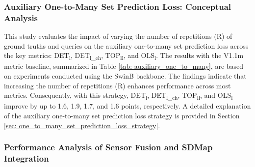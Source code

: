 \subsubsection{Auxiliary One-to-Many Set Prediction Loss: Conceptual Analysis}
\label{sec: exp_one_to_many}

This study evaluates the impact of varying the number of repetitions (R) of ground truths and queries on the auxiliary one-to-many set prediction loss across the key metrics: DET\textsubscript{l}, DET\textsubscript{l\_ch}, TOP\textsubscript{ll}, and OLS\textsubscript{l}. The results with the V1.1m metric baseline, summarized in Table \ref{tab: auxiliary_one_to_many}, are based on experiments conducted using the SwinB backbone. The findings indicate that increasing the number of repetitions (R) enhances performance across most metrics. Consequently, with this strategy, DET\textsubscript{l}, DET\textsubscript{l\_ch}, TOP\textsubscript{ll}, and OLS\textsubscript{l} improve by up to 1.6, 1.9, 1.7, and 1.6 points, respectively. A detailed explanation of the auxiliary one-to-many set prediction loss strategy is provided in Section \ref{sec: one_to_many_set_prediction_loss_strategy}.


\subsubsection{Performance Analysis of Sensor Fusion and SDMap Integration}
\label{sec: exp_fusion_analysis}


\begin{table}[t]
\centering
\caption{Sensor Fusion and SDMap Integration Ablations in Subset-A and Subset-B of OpenLane-V2 with V1.1m Baseline. The configuration with the lidar encoder (SECOND) is marked with a dagger (\dag) \cite{yan2018second}.}
\label{tab: sensor_fusion_subset}
\end{table}

